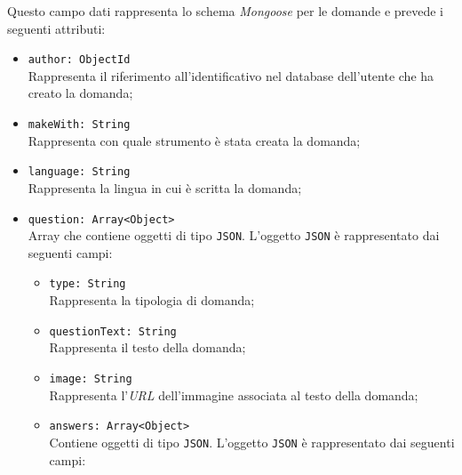 \begin{itemize}
\begin{itemize}
		Questo campo dati rappresenta lo schema \textit{Mongoose} per le domande e prevede i seguenti attributi:
		\begin{itemize}
			\item \texttt{author: ObjectId}\\ Rappresenta il riferimento all'identificativo nel database dell'utente che ha creato la domanda;
			\item \texttt{makeWith: String}\\ Rappresenta con quale strumento è stata creata la domanda;
			\item \texttt{language: String}\\ Rappresenta la lingua in cui è scritta la domanda; 
			\item \texttt{question: Array<Object>}\\ Array che contiene oggetti di tipo \texttt{JSON}. L'oggetto \texttt{JSON} è rappresentato dai seguenti campi:
				\begin{itemize}
					\item \texttt{type: String}\\ Rappresenta la tipologia di domanda; 
					\item \texttt{questionText: String}\\ Rappresenta il testo della domanda; 
					\item \texttt{image: String}\\ Rappresenta l'\textit{URL} dell'immagine associata al testo della domanda; 
					\item \texttt{answers: Array<Object>}\\ Contiene oggetti di tipo \texttt{JSON}. L'oggetto \texttt{JSON} è rappresentato dai seguenti campi:
					\begin{enumerate}	
										  

\end{enumerate}
\end{itemize}
\end{itemize}
\end{itemize}
\end{itemize}
